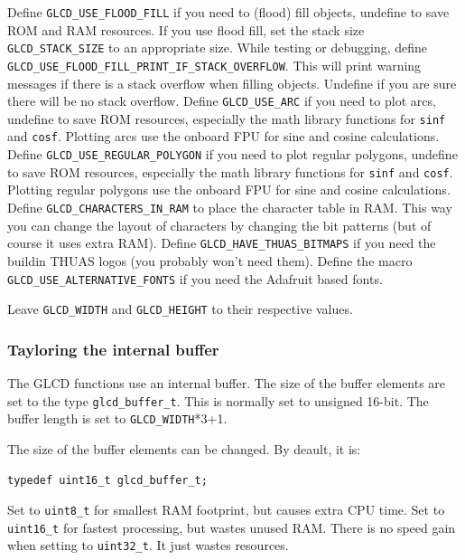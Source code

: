 \documentclass[12pt]{article}
\begin{document}
Define \lstinline|GLCD_USE_FLOOD_FILL| if you need to (flood) fill objects, undefine to save ROM  and RAM resources. If you use flood fill, set the stack size \lstinline|GLCD_STACK_SIZE| to an appropriate size. While testing or debugging, define \lstinline|GLCD_USE_FLOOD_FILL_PRINT_IF_STACK_OVERFLOW|. This will print warning messages if there is a stack overflow when filling objects. Undefine if you are sure there will be no stack overflow. Define \lstinline|GLCD_USE_ARC| if you need to plot arcs, undefine to save ROM resources, especially the math library functions for \lstinline|sinf| and \lstinline|cosf|. Plotting arcs use the onboard FPU for sine and cosine calculations. Define \lstinline|GLCD_USE_REGULAR_POLYGON| if you need to plot regular polygons, undefine to save ROM resources, especially the math library functions for \lstinline|sinf| and \lstinline|cosf|. Plotting regular polygons use the onboard FPU for sine and cosine calculations. Define \lstinline|GLCD_CHARACTERS_IN_RAM| to place the character table in RAM. This way you can change the layout of characters by changing the bit patterns (but of course it uses extra RAM). Define \lstinline|GLCD_HAVE_THUAS_BITMAPS| if you need the buildin THUAS logos (you probably won't need them).
Define the macro \lstinline|GLCD_USE_ALTERNATIVE_FONTS| if you need the Adafruit based fonts.

Leave \lstinline|GLCD_WIDTH| and \lstinline|GLCD_HEIGHT| to their respective values.

\subsubsection{Tayloring the internal buffer}
\label{sec:taylorbuffer}
The GLCD functions use an internal buffer. The size of the buffer elements are set to the type \lstinline|glcd_buffer_t|. This is normally set to unsigned 16-bit. The buffer length is set to \lstinline|GLCD_WIDTH|*3+1.

The size of the buffer elements can be changed. By deault, it is:

\begin{lstlisting}
typedef uint16_t glcd_buffer_t;
\end{lstlisting}

Set to \lstinline|uint8_t| for smallest RAM footprint, but causes extra CPU time. Set to \lstinline|uint16_t| for fastest processing, but wastes unused RAM. There is no speed gain when setting to \lstinline|uint32_t|. It just wastes resources.
\end{document}
